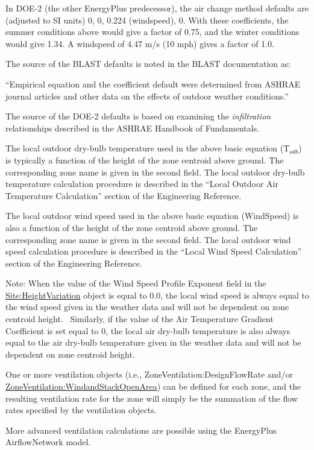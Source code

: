 In DOE-2 (the other EnergyPlus predecessor), the air change method defaults are (adjusted to SI units) 0, 0, 0.224 (windspeed), 0. With these coefficients, the summer conditions above would give a factor of 0.75, and the winter conditions would give 1.34. A windspeed of 4.47 m/s (10 mph) gives a factor of 1.0.

The source of the BLAST defaults is noted in the BLAST documentation as:

``Empirical equation and the coefficient default were determined from ASHRAE journal articles and other data on the effects of outdoor weather conditions.''

The source of the DOE-2 defaults is based on examining the \emph{infiltration} relationships described in the ASHRAE Handbook of Fundamentals.

The local outdoor dry-bulb temperature used in the above basic equation (T\(_{odb}\)) is typically a function of the height of the zone centroid above ground. The corresponding zone name is given in the second field. The local outdoor dry-bulb temperature calculation procedure is described in the ``Local Outdoor Air Temperature Calculation'' section of the Engineering Reference.

The local outdoor wind speed used in the above basic equation (WindSpeed) is also a function of the height of the zone centroid above ground. The corresponding zone name is given in the second field. The local outdoor wind speed calculation procedure is described in the ``Local Wind Speed Calculation'' section of the Engineering Reference.

Note: When the value of the Wind Speed Profile Exponent field in the \hyperref[siteheightvariation]{Site:HeightVariation} object is equal to 0.0, the local wind speed is always equal to the wind speed given in the weather data and will not be dependent on zone centroid height.~ Similarly, if the value of the Air Temperature Gradient Coefficient is set equal to 0, the local air dry-bulb temperature is also always equal to the air dry-bulb temperature given in the weather data and will not be dependent on zone centroid height.

One or more ventilation objects (i.e., ZoneVentilation:DesignFlowRate and/or \hyperref[zoneventilationwindandstackopenarea]{ZoneVentilation:WindandStackOpenArea}) can be defined for each zone, and the resulting ventilation rate for the zone will simply be the summation of the flow rates specified by the ventilation objects.

More advanced ventilation calculations are possible using the EnergyPlus AirflowNetwork model.

